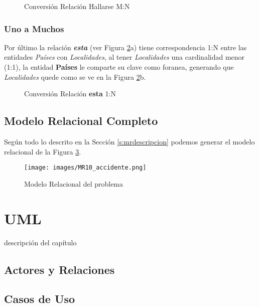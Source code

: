 \documentclass[letter,12pt]{report}
\begin{document}
\begin{figure}[H]
\centering
{}
\caption{Conversión Relación Hallarse M:N} \label{f:mrhallarse}
\end{figure}

\subsection{Uno a Muchos}

Por último la relación \textbf{\textit{esta}} (ver Figura \ref{f:mresta}a) tiene correspondencia 1:N entre las entidades \textit{Países} con \textit{Localidades}, al tener \textit{Localidades} una cardinalidad menor (1:1), la entidad \textbf{Países} le comparte su clave como foranea, generando que \textit{Localidades} quede como se ve en la Figura \ref{f:mresta}b.

\begin{figure}[H]
\centering
{}
\caption{Conversión Relación \textbf{esta} 1:N} \label{f:mresta}
\end{figure}

\begin{landscape}
\section{Modelo Relacional Completo}
Según todo lo descrito en la Sección \ref{s:mrdescripcion} podemos generar el modelo relacional de la Figura \ref{f:mrcompleto}.
\begin{figure}[hbt]
\centering
  \texttt{[image: images/MR10\_accidente.png]}
  \caption{Modelo Relacional del problema}
  \label{f:mrcompleto}
\end{figure}
\end{landscape}

\chapter{UML}
descripción del capítulo
\section{Actores y Relaciones}
\section{Casos de Uso}
\end{document}
